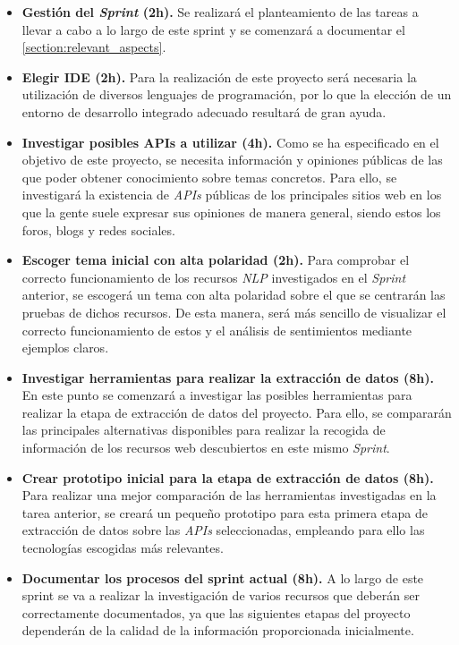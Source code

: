 \begin{itemize}

    \item \textbf{Gestión del \textit{Sprint} (2h).} Se realizará el planteamiento de las tareas a llevar a cabo a lo largo de este sprint y se comenzará a documentar el \autoref{section:relevant_aspects}.

    \item \textbf{Elegir IDE (2h).} Para la realización de este proyecto será necesaria la utilización de diversos lenguajes de programación, por lo que la elección de un entorno de desarrollo integrado adecuado resultará de gran ayuda.

    \item \textbf{Investigar posibles APIs a utilizar (4h).} Como se ha especificado en el objetivo de este proyecto, se necesita información y opiniones públicas de las que poder obtener conocimiento sobre temas concretos. Para ello, se investigará la existencia de \textit{APIs} públicas de los principales sitios web en los que la gente suele expresar sus opiniones de manera general, siendo estos los foros, blogs y redes sociales.

    \item \textbf{Escoger tema inicial con alta polaridad (2h).} Para comprobar el correcto funcionamiento de los recursos \textit{NLP} investigados en el \textit{Sprint} anterior, se escogerá un tema con alta polaridad sobre el que se centrarán las pruebas de dichos recursos. De esta manera, será más sencillo de visualizar el correcto funcionamiento de estos y el análisis de sentimientos mediante ejemplos claros.

    \item \textbf{Investigar herramientas para realizar la extracción de datos (8h).} En este punto se comenzará a investigar las posibles herramientas para realizar la etapa de extracción de datos del proyecto. Para ello, se compararán las principales alternativas disponibles para realizar la recogida de información de los recursos web descubiertos en este mismo \textit{Sprint}.

    \item \textbf{Crear prototipo inicial para la etapa de extracción de datos (8h).} Para realizar una mejor comparación de las herramientas investigadas en la tarea anterior, se creará un pequeño prototipo para esta primera etapa de extracción de datos sobre las \textit{APIs} seleccionadas, empleando para ello las tecnologías escogidas más relevantes.

    \item \textbf{Documentar los procesos del sprint actual (8h).} A lo largo de este sprint se va a realizar la investigación de varios recursos que deberán ser correctamente documentados, ya que las siguientes etapas del proyecto dependerán de la calidad de la información proporcionada inicialmente.

\end{itemize}

